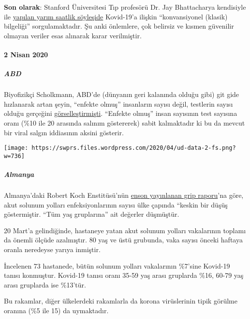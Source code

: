 \textbf{Son olarak}: Stanford Üniversitesi Tıp profesörü Dr. Jay
Bhattacharya kendisiyle ile
\href{https://www.youtube.com/watch?v=-UO3Wd5urg0}{yapılan yarım saatlik
söyleşide} Kovid-19'a ilişkin ``konvansiyonel (klasik) bilgeliği''
sorgulamaktadır. Şu anki önlemlere, çok belirsiz ve kısmen güvenilir
olmayan veriler esas alınarak karar verilmiştir.

\hypertarget{2-nisan-2020}{%
\paragraph{2 Nisan 2020}\label{2-nisan-2020}}

\hypertarget{abd}{%
\subparagraph{\texorpdfstring{\textbf{ABD}}{ABD}}\label{abd}}

Biyofizikçi Scholkmann, ABD'de (dünyanın geri kalanında olduğu gibi) git
gide hızlanarak artan şeyin, ``enfekte olmuş'' insanların sayısı değil,
testlerin sayısı olduğu gerçeğini
\href{https://swprs.org/rate-of-positive-covid19-tests/}{görselleştirmişti}.
``Enfekte olmuş'' insan sayısının test sayısına oranı (\%10 ile 20
arasında salınım göstererek) sabit kalmaktadır ki bu da mevcut bir viral
salgın iddiasının aksini gösterir.

\texttt{[image: https://swprs.files.wordpress.com/2020/04/ud-data-2-fs.png?w=736]}

\hypertarget{almanya}{%
\subparagraph{\texorpdfstring{\textbf{Almanya}}{Almanya}}\label{almanya}}

Almanya'daki Robert Koch Enstitüsü'nün
\href{https://influenza.rki.de/Wochenberichte/2019_2020/2020-13.pdf}{e}\href{https://influenza.rki.de/Wochenberichte/2019_2020/2020-13.pdf}{n}\href{https://influenza.rki.de/Wochenberichte/2019_2020/2020-13.pdf}{s}\href{https://influenza.rki.de/Wochenberichte/2019_2020/2020-13.pdf}{on
yayınlanan grip raporu}'na göre, akut solunum yolları enfeksiyonlarının
sayısı ülke çapında ``keskin bir düşüş göstermiştir. ``Tüm yaş
gruplarına'' ait değerler düşmüştür.

20 Mart'a gelindiğinde, hastaneye yatan akut solunum yolları vakalarının
toplamı da önemli ölçüde azalmıştır. 80 yaş ve üstü grubunda, vaka
sayısı önceki haftaya oranla neredeyse yarıya inmiştir.

İncelenen 73 hastanede, bütün solunum yolları vakalarının \%7'sine
Kovid-19 tanısı konmuştur. Kovid-19 tanısı oranı 35-59 yaş arası
gruplarda \%16, 60-79 yaş arası gruplarda ise \%13'tür.

Bu rakamlar, diğer ülkelerdeki rakamlarla da korona virüslerinin tipik
görülme oranına (\%5 ile 15) da uymaktadır.

